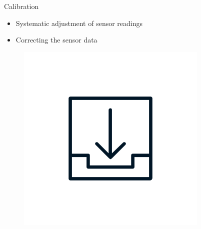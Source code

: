 \documentclass[aspectratio=169]{beamer}
[aspectratio=169] %
\begin{document}
\begin{frame}{Calibration}
  \begin{minipage}{0.49\textwidth} 
    \begin{itemize}
      \item Systematic adjustment of sensor readings
      \item Correcting the sensor data
    \end{itemize}
  \end{minipage}
  \hfill
  \begin{minipage}{0.49\textwidth} 
    \begin{figure}
      \centering
      \includegraphics[height=0.5\textheight]{figures/download.png}
    \end{figure}
  \end{minipage}
\end{frame}

\end{document}
